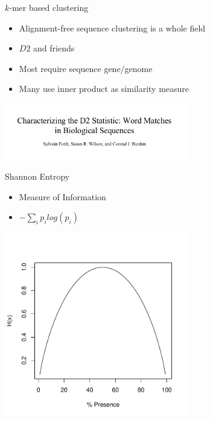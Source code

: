 \documentclass[t]{beamer}
\begin{document}
\begin{frame}{$k$-mer based clustering}
  \begin{itemize}
    \item Alignment-free sequence clustering is a whole field
    \item $D2$ and friends
    \item Most require sequence gene/genome
    \item Many use inner product as similarity measure
  \end{itemize}
  \begin{center}
    \includegraphics[width=0.6\textwidth]{img/foret-et-al-d2.png}
  \end{center}
\end{frame}

\begin{frame}{Shannon Entropy}
  \begin{itemize}
    \item Measure of Information
    \item $ -\sum\limits_{i} p_i log(p_i) $
  \end{itemize}
  \begin{center}
    \includegraphics[width=0.6\textwidth]{img/shanent.pdf}
  \end{center}
\end{frame}
\end{document}
